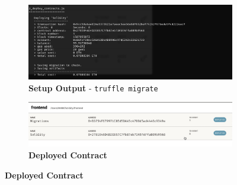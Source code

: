 \documentclass[12pt]{article}
\renewcommand{\_}{\kern-1.5pt\textunderscore\kern-1.5pt}
\begin{document}
\begin{figure}[H]
\begin{minipage}[t]{0.5\linewidth}
	\begin{subfigure}[t]{\textwidth}
	\captionsetup{justification   = raggedright,
              singlelinecheck = false}
		\centering
				\caption*{\textbf{Setup Output} - \texttt{truffle migrate}}
		\includegraphics[width=\textwidth]{graphs/07. truffle_migrate.jpg}
	\end{subfigure}
	\begin{subfigure}[t]{\textwidth}
	\captionsetup{justification   = raggedright,
              singlelinecheck = false}
		\centering
				\caption*{\textbf{Deployed Contract}}
		\includegraphics[width=\textwidth]{graphs/08. ganache_deployed_contract.jpg}
	\end{subfigure}

	\end{minipage}
\end{figure}

\end{document}
